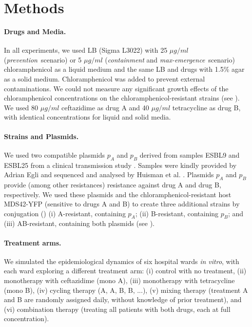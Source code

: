 
\section{Methods}
\paragraph{Drugs and Media.}
In all experiments, we used LB (Sigma L3022) with 25 $\mu g/ml$ (\textit{prevention}~scenario) or 5 $\mu g/ml$ (\textit{containment} and \textit{max-emergence}~scenario) chloramphenicol as a liquid medium and the same LB and drugs with 1.5\% agar as a solid medium.
Chloramphenicol was added to prevent external contaminations. We could not measure any significant growth effects of the chloramphenicol concentrations on the chloramphenicol-resistant strains (see ).
We used 80 $\mu g/ml$ ceftazidime as drug A and 40 $\mu g/ml$ tetracycline as drug B, with identical concentrations for liquid and solid media.

\paragraph{Strains and Plasmids.}
We used two compatible plasmids $p_A$ and $p_B$ derived from samples ESBL9 and ESBL25 from a clinical transmission study \cite{Sutter2016}. 
Samples were kindly provided by Adrian Egli and sequenced and analysed by Huisman et al. \cite{Huisman2022}. 
Plasmids $p_A$ and $p_B$ provide (among other resistances) resistance against drug A and drug B, respectively.
We used these plasmids and the chloramphenicol-resistant host MDS42-YFP \cite{Feher2012} (sensitive to drugs A and B) to create three additional strains by conjugation () (i) A-resistant, containing $p_A$; (ii) B-resistant, containing $p_B$; and (iii) AB-resistant, containing both plasmids (see ).

\paragraph{Treatment arms.}
We simulated the epidemiological dynamics of six hospital wards \textit{in vitro}, with each ward exploring a different treatment arm:
(i) control with no treatment, (ii) monotherapy with ceftazidime (mono A), (iii) monotherapy with tetracycline (mono B), (iv) cycling therapy (A, A, B, B, ...), (v) mixing therapy (treatment A and B are randomly assigned daily, without knowledge of prior treatment), and (vi) combination therapy (treating all patients with both drugs, each at full concentration).

